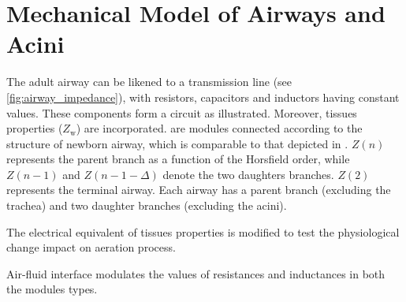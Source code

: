\section{Mechanical Model of Airways and Acini}




The adult airway can be likened to a transmission line (see
\cref{fig:airway_impedance}), with resistors, capacitors and inductors
having constant values.  These components form a circuit as
illustrated.  Moreover, tissues properties ($Z_{\text{w}}$) are
incorporated.   are
modules connected according to the structure of newborn airway, which
is comparable to that depicted in
.  $Z(n)$ represents the parent
branch as a function of the Horsfield order, while $Z(n-1)$ and
$Z(n-1-\Delta)$ denote the two daughters branches.  $Z(2)$ represents
the terminal airway.  Each airway has a parent branch (excluding the
trachea) and two daughter branches (excluding the acini).


The electrical equivalent of tissues properties is modified to test
the physiological change impact on aeration process.


Air-fluid interface modulates the values of resistances and
inductances in both the modules types.

